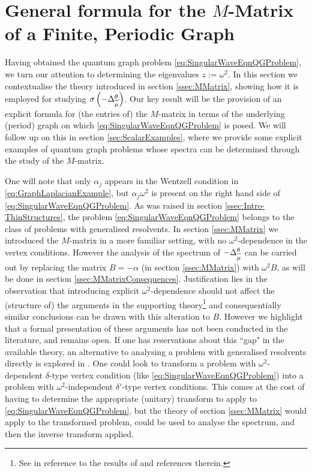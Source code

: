\section{General formula for the $M$-Matrix of a Finite, Periodic Graph} \label{sec:ScalarDiscussion}
Having obtained the quantum graph problem \eqref{eq:SingularWaveEqnQGProblem}, we turn our attention to determining the eigenvalues $z := \omega^2$.
In this section we contextualise the theory introduced in section \ref{ssec:MMatrix}, showing how it is employed for studying $\sigma\left( -\Delta_{\widetilde{\mu}}^{\theta} \right)$.
Our key result will be the provision of an explicit formula for (the entries of) the $M$-matrix in terms of the underlying (period) graph on which \eqref{eq:SingularWaveEqnQGProblem} is posed.
We will follow up on this in section \ref{sec:ScalarExamples}, where we provide some explicit examples of quantum graph problems whose spectra can be determined through the study of the $M$-matrix.

One will note that only $\alpha_j$ appears in the Wentzell condition in \eqref{eq:GraphLaplacianExample}, but $\alpha_j\omega^2$ is present on the right hand side of \eqref{eq:SingularWaveEqnQGProblem}.
As was raised in section \ref{ssec:Intro-ThinStructures}, the problem \eqref{eq:SingularWaveEqnQGProblem} belongs to the class of problems with generalised resolvents.
In section \ref{ssec:MMatrix} we introduced the $M$-matrix in a more familiar setting, with no $\omega^2$-dependence in the vertex conditions.
However the analysis of the spectrum of $-\Delta_{\widetilde{\mu}}^{\theta}$ can be carried out by replacing the matrix $B=-\alpha$ (in section \ref{ssec:MMatrix}) with $\omega^2 B$, as will be done in section \ref{ssec:MMatrixConsequences}.
Justification lies in the observation that introducing explicit $\omega^2$-dependence should not affect the (structure of) the arguments in the supporting theory\footnote{See \cite[page 1846]{cherednichenko2018effective} in reference to the results of \cite{ryzhov2009weyl} and references therein.} and consequentially similar conclusions can be drawn with this alteration to $B$.
However we highlight that a formal presentation of these arguments has not been conducted in the literature, and remains open.
If one has reservations about this ``gap" in the available theory, an alternative to analysing a problem with generalised resolvents directly is explored in \cite[Section 6]{cherednichenko2017norm}.
One could look to transform a problem with $\omega^2$-dependent $\delta$-type vertex condition (like \eqref{eq:SingularWaveEqnQGProblem}) into a problem with $\omega^2$-independent $\delta'$-type vertex conditions.
This comes at the cost of having to determine the appropriate (unitary) transform to apply to \eqref{eq:SingularWaveEqnQGProblem}, but the theory of section \ref{ssec:MMatrix} would apply to the transformed problem, could be used to analyse the spectrum, and then the inverse transform applied.

